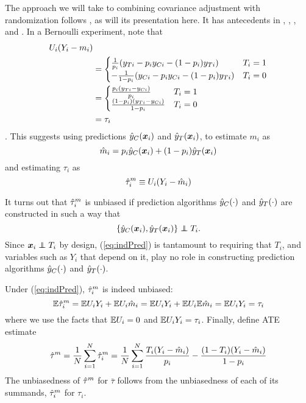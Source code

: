 The approach we will take to combining covariance adjustment with
randomization follows \citet{loop}, as will its presentation here.
It has antecedents in \citet{rosenbaum2002covariance},
\citet{aronowMiddleton}, \citet{wager2016high}, and \citet{tame}.
In a Bernoulli experiment, note that
\begin{align*}
U_i(Y_i-m_i)&\\
&=\begin{cases}
\frac{1}{p_i}(y_{Ti}-p_iy_{Ci}-(1-p_i)y_{Ti})&T_i=1\\
-\frac{1}{1-p_i}(y_{Ci}-p_iy_{Ci}-(1-p_i)y_{Ti})&T_i=0 \end{cases}\\
&=\begin{cases}
\frac{p_i(y_{Ti}-y_{Ci})}{p_i}&T_i=1\\
\frac{(1-p_i)(y_{Ti}-y_{Ci})}{1-p_i}&T_i=0
\end{cases}\\
&=\tau_i
\end{align*}.
This suggests using predictions $\hat{y}_C(\bm{x}_i)$ and $\hat{y}_T(\bm{x}_i)$, to estimate $m_i$ as
\begin{equation}\label{eq:hatm}
\hat{m}_i=p_i\hat{y}_C(\bm{x}_i)+(1-p_i)\hat{y}_T(\bm{x}_i)
\end{equation}
and estimating $\tau_i$ as
\begin{equation*}
\hat{\tau}_i^m\equiv U_i(Y_i-\hat{m}_i)
\end{equation*}

It turns out that $\hat{\tau}_i^m$ is unbiased if prediction algorithms $\hat{y}_C(\cdot)$ and $\hat{y}_T(\cdot)$
are constructed in such a way that
\begin{equation}\label{eq:indPred}
\{\predcx,\predtx\}\independent T_i.
\end{equation}
Since $\bm{x}_i\independent T_i$ by design, (\ref{eq:indPred}) is
tantamount to requiring that $T_i$, and variables such as $Y_i$ that
depend on it, play no role in constructing prediction algorithms $\hat{y}_C(\cdot)$ and
$\hat{y}_T(\cdot)$.

Under (\ref{eq:indPred}), $\hat{\tau}_i^m$ is indeed unbiased:
\begin{equation}
\mathbb{E} \hat{\tau}_i^m=\mathbb{E} U_iY_i+\mathbb{E} U_i\hat{m}_i=\mathbb{E} U_iY_i+\mathbb{E} U_i\mathbb{E}\hat{m}_i=\mathbb{E}
U_iY_i=\tau_i
\end{equation}
where we use the facts that $\mathbb{E} U_i=0$ and $\mathbb{E} U_iY_i=\tau_i$.
Finally, define ATE estimate
\begin{equation}
\hat{\tau}^m=\frac{1}{N}\displaystyle\sum_{i=1}^N
\hat{\tau}_i^m=\frac{1}{N}\displaystyle\sum_{i=1}^N
\frac{T_i(Y_i-\hat{m}_i)}{p_i}-\frac{(1-T_i)(Y_i-\hat{m}_i)}{1-p_i}
\end{equation}
The unbiasedness of $\hat{\tau}^m$ for $\bar{\tau}$ follows from the
unbiasedness of each of its summands, $\hat{\tau}_i^m$ for $\tau_i$.

